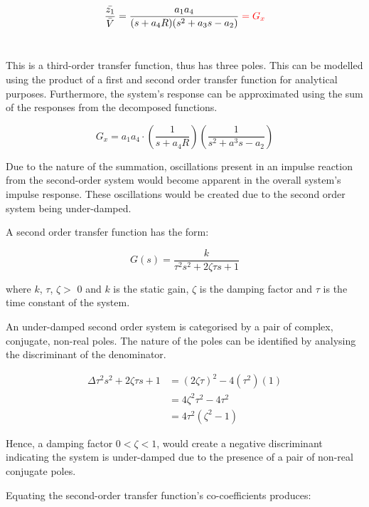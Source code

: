 \documentclass[a4paper,10pt,reqno]{amsart}
\numberwithin{equation}{section}
\begin{document}
\begin{equation}
    \frac{\bar{z_1}}{\bar{V}}=\frac{a_1a_4}{(s+a_4R)(s^2+a_3s-a_2)}\color{red}= G_x\color{black}
\end{equation}
\\

\par This is a third-order transfer function, thus has three poles. This can be modelled using the product of a first and second order transfer function for analytical purposes. Furthermore, the system's response can be approximated using the sum of the responses from the decomposed functions.

\begin{equation}
    G_x = a_1a_4\cdot(\frac{1}{s+a_4R})(\frac{1}{s^2+a^3s-a_2})
\end{equation}

\par Due to the nature of the summation, oscillations present in an impulse reaction from the second-order system would become apparent in the overall system's impulse response. These oscillations would be created due to the second order system being under-damped.
\\
\par A second order transfer function has the form:

\begin{equation}
    G(s) = \frac{k}{\tau^2s^2+2\zeta\tau s+1}
\end{equation}

\par where $k$, $\tau$, $\zeta >$ 0 and $k$ is the static gain, $\zeta$ is the damping factor and $\tau$ is the time constant of the system.
\par An under-damped second order system is categorised by a pair of complex, conjugate, non-real poles. The nature of the poles can be identified by analysing the discriminant of the denominator.

\begin{align*}
    \Delta\tau^2s^2+2\zeta\tau s+1&=(2\zeta\tau)^2 - 4(\tau^2)(1)
    \\
    &=4\zeta^2\tau^2-4\tau^2
    \\
    &=4\tau^2(\zeta^2-1)
\end{align*}

Hence, a damping factor $0 < \zeta < 1$, would create a negative discriminant indicating the system is under-damped due to the presence of a pair of non-real conjugate poles.
\\
\par Equating the second-order transfer function's co-coefficients produces:
\end{document}
